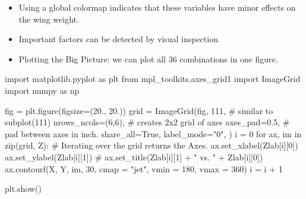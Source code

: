 \documentclass[
  letterpaper,
  DIV=11,
  numbers=noendperiod]{scrreprt}
\newenvironment{Shaded}{\begin{snugshade}}{\end{snugshade}}
\newcommand{\BuiltInTok}[1]{\textcolor[rgb]{0.00,0.23,0.31}{#1}}
\newcommand{\CommentTok}[1]{\textcolor[rgb]{0.37,0.37,0.37}{#1}}
\newcommand{\ControlFlowTok}[1]{\textcolor[rgb]{0.00,0.23,0.31}{#1}}
\newcommand{\DecValTok}[1]{\textcolor[rgb]{0.68,0.00,0.00}{#1}}
\newcommand{\FloatTok}[1]{\textcolor[rgb]{0.68,0.00,0.00}{#1}}
\newcommand{\ImportTok}[1]{\textcolor[rgb]{0.00,0.46,0.62}{#1}}
\newcommand{\KeywordTok}[1]{\textcolor[rgb]{0.00,0.23,0.31}{#1}}
\newcommand{\NormalTok}[1]{\textcolor[rgb]{0.00,0.23,0.31}{#1}}
\newcommand{\OperatorTok}[1]{\textcolor[rgb]{0.37,0.37,0.37}{#1}}
\newcommand{\StringTok}[1]{\textcolor[rgb]{0.13,0.47,0.30}{#1}}
\newcommand{\VariableTok}[1]{\textcolor[rgb]{0.07,0.07,0.07}{#1}}
\providecommand{\tightlist}{%
  \setlength{\itemsep}{0pt}\setlength{\parskip}{0pt}}\usepackage{longtable,booktabs,array}
\begin{document}
\begin{itemize}
\tightlist
\item
  Using a global colormap indicates that these variables have minor
  effects on the wing weight.
\item
  Important factors can be detected by visual inspection
\item
  Plotting the Big Picture: we can plot all 36 combinations in one
  figure.
\end{itemize}

\begin{Shaded}
\begin{Highlighting}[]
\ImportTok{import}\NormalTok{ matplotlib.pyplot }\ImportTok{as}\NormalTok{ plt}
\ImportTok{from}\NormalTok{ mpl\_toolkits.axes\_grid1 }\ImportTok{import}\NormalTok{ ImageGrid}
\ImportTok{import}\NormalTok{ numpy }\ImportTok{as}\NormalTok{ np}

\NormalTok{fig }\OperatorTok{=}\NormalTok{ plt.figure(figsize}\OperatorTok{=}\NormalTok{(}\FloatTok{20.}\NormalTok{, }\FloatTok{20.}\NormalTok{))}
\NormalTok{grid }\OperatorTok{=}\NormalTok{ ImageGrid(fig, }\DecValTok{111}\NormalTok{,  }\CommentTok{\# similar to subplot(111)}
\NormalTok{                 nrows\_ncols}\OperatorTok{=}\NormalTok{(}\DecValTok{6}\NormalTok{,}\DecValTok{6}\NormalTok{),  }\CommentTok{\# creates 2x2 grid of axes}
\NormalTok{                 axes\_pad}\OperatorTok{=}\FloatTok{0.5}\NormalTok{,  }\CommentTok{\# pad between axes in inch.}
\NormalTok{                 share\_all}\OperatorTok{=}\VariableTok{True}\NormalTok{,}
\NormalTok{                 label\_mode}\OperatorTok{=}\StringTok{"0"}\NormalTok{,}
\NormalTok{                 ) }
\NormalTok{i }\OperatorTok{=} \DecValTok{0}
\ControlFlowTok{for}\NormalTok{ ax, im }\KeywordTok{in} \BuiltInTok{zip}\NormalTok{(grid, Z):}
    \CommentTok{\# Iterating over the grid returns the Axes.}
\NormalTok{    ax.set\_xlabel(Zlab[i][}\DecValTok{0}\NormalTok{])}
\NormalTok{    ax.set\_ylabel(Zlab[i][}\DecValTok{1}\NormalTok{])}
    \CommentTok{\# ax.set\_title(Zlab[i][1] + " vs. " + Zlab[i][0])}
\NormalTok{    ax.contourf(X, Y, im, }\DecValTok{30}\NormalTok{, cmap }\OperatorTok{=} \StringTok{"jet"}\NormalTok{,  vmin }\OperatorTok{=} \DecValTok{180}\NormalTok{, vmax }\OperatorTok{=} \DecValTok{360}\NormalTok{)}
\NormalTok{    i }\OperatorTok{=}\NormalTok{ i }\OperatorTok{+} \DecValTok{1}
       
\NormalTok{plt.show()}
\end{Highlighting}
\end{Shaded}
\end{document}
